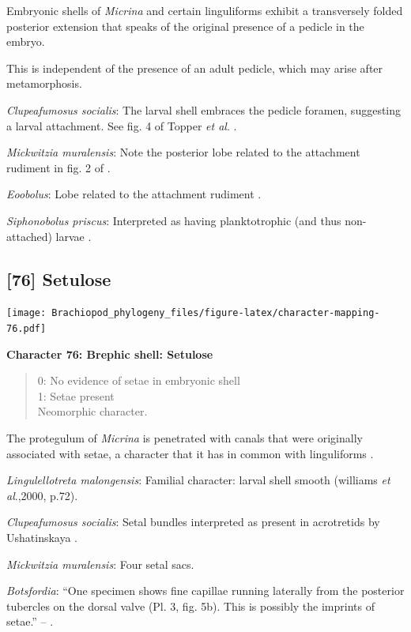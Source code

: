 \documentclass[]{book}
\theoremstyle{definition}
\theoremstyle{definition}
\theoremstyle{definition}
\theoremstyle{remark}
\begin{document}
Embryonic shells of \emph{Micrina} and certain linguliforms exhibit a
transversely folded posterior extension that speaks of the original
presence of a pedicle in the embryo.

This is independent of the presence of an adult pedicle, which may arise
after metamorphosis.

\emph{Clupeafumosus socialis}: The larval shell embraces the pedicle
foramen, suggesting a larval attachment. See fig. 4 of Topper \emph{et
al}. \citeyearpar{Topper2013Reappraisalof}.

\emph{Mickwitzia muralensis}: Note the posterior lobe related to the
attachment rudiment in fig. 2 of \citet{Balthasar2009Thebrachiopod}.

\emph{Eoobolus}: Lobe related to the attachment rudiment \citep[fig.
2]{Balthasar2009Thebrachiopod}.

\emph{Siphonobolus priscus}: Interpreted as having planktotrophic (and
thus non-attached) larvae \citep{Popov2009Earlyontogeny}.

\hypertarget{setulose}{%
\subsection*{{[}76{]} Setulose}\label{setulose}}

\texttt{[image: Brachiopod\_phylogeny\_files/figure-latex/character-mapping-76.pdf]}

\textbf{Character 76: Brephic shell: Setulose}

\begin{quote}
0: No evidence of setae in embryonic shell\\
1: Setae present\\
Neomorphic character.
\end{quote}

The protegulum of \emph{Micrina} is penetrated with canals that were
originally associated with setae, a character that it has in common with
linguliforms \citep{Holmer2011Firstrecord}.

\emph{Lingulellotreta malongensis}: Familial character: larval shell
smooth (williams \emph{et al}.,2000, p.72).

\emph{Clupeafumosus socialis}: Setal bundles interpreted as present in
acrotretids by Ushatinskaya \citeyearpar{Ushatinskaya2016Protegulumand}.

\emph{Mickwitzia muralensis}: Four setal sacs.

\emph{Botsfordia}: ``One specimen shows fine capillae running laterally
from the posterior tubercles on the dorsal valve (Pl. 3, fig. 5b). This
is possibly the imprints of setae.'' --
\citet{Ushatinskaya2016Revisionof}.
\end{document}
